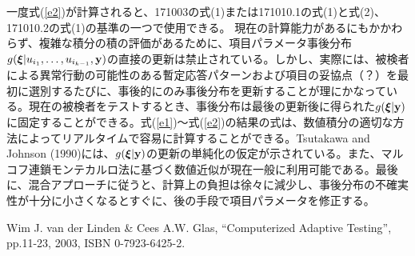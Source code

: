 \documentclass[a4j]{jarticle}
\begin{document}
一度式(\ref{e2})が計算されると、171003の式(1)または171010.1の式(1)と式(2)、171010.2の式(1)の基準の一つで使用できる。
現在の計算能力があるにもかかわらず、複雑な積分の積の評価があるために、項目パラメータ事後分布$g(\bm{\xi}|u_{i_{1}},\ldots,u_{i_{k-1}},\bm{{\rm y}})$の直接の更新は禁止されている。しかし、実際には、被検者による異常行動の可能性のある暫定応答パターンおよび項目の妥協点（？）を最初に選別するたびに、事後的にのみ事後分布を更新することが理にかなっている。現在の被検者をテストするとき、事後分布は最後の更新後に得られた$g(\bm{\xi}|\bm{{\rm y}})$に固定することができる。式(\ref{e1})〜式(\ref{e2})の結果の式は、数値積分の適切な方法によってリアルタイムで容易に計算することができる。Tsutakawa and Johnson (1990)には、$g(\bm{\xi}|\bm{{\rm y}})$の更新の単純化の仮定が示されている。また、マルコフ連鎖モンテカルロ法に基づく数値近似が現在一般に利用可能である。最後に、混合アプローチに従うと、計算上の負担は徐々に減少し、事後分布の不確実性が十分に小さくなるとすぐに、後の手段で項目パラメータを修正する。

\begin{thebibliography}{9}
   Wim J. van der Linden \& Cees A.W. Glas, ``Computerized Adaptive Testing'', pp.11-23, 2003, ISBN 0-7923-6425-2.
\end{thebibliography}
\end{document}
